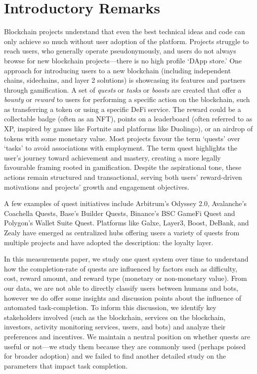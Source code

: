 
\section{Introductory Remarks}

Blockchain projects understand that even the best technical ideas and code can only achieve so much without user adoption of the platform. Projects struggle to reach users, who generally operate pseudonymously, and users do not always browse for new blockchain projects---there is no high profile `DApp store.'  One approach for introducing users to a new blockchain (including independent chains, sidechains, and layer 2 solutions) is showcasing its features and partners through gamification. A set of \textit{quests} or \textit{tasks} or \textit{boosts} are created that offer a \textit{bounty} or \textit{reward} to users for performing a specific action on the blockchain, such as transferring a token or using a specific DeFi service. The reward could be a collectable badge (often as an NFT), points on a leaderboard (often referred to as XP, inspired by games like Fortnite and platforms like Duolingo), or an airdrop of tokens with some monetary value. Most projects favour the term `quests' over `tasks' to avoid associations with employment. The term quest highlights the user's journey toward achievement and mastery, creating a more legally favourable framing rooted in gamification. Despite the aspirational tone, these actions remain structured and transactional, serving both users’ reward-driven motivations and projects’ growth and engagement objectives.

A few examples of quest initiatives include Arbitrum's Odyssey 2.0, Avalanche's Coachella Quests, Base's Builder Quests, Binance's BSC GameFi Quest and Polygon's Wallet Suite Quest. Platforms like Galxe, Layer3, Boost, DeBank, and Zealy have emerged as centralized hubs offering users a variety of quests from multiple projects and have adopted the description: the loyalty layer. 

In this measurements paper, we study one quest system over time to understand how the completion-rate of quests are influenced by factors such as difficulty, cost, reward amount, and reward type (monetary or non-monetary value). From our data, we are not able to directly classify users between humans and bots, however we do offer some insights and discussion points about the influence of automated task-completion. To inform this discussion, we identify key stakeholders involved (such as the blockchain, services on the blockchain, investors, activity monitoring services, users, and bots) and analyze their preferences and incentives. We maintain a neutral position on whether quests are useful or not---we study them because they are commonly used (perhaps poised for broader adoption) and we failed to find another detailed study on the parameters that impact task completion.

